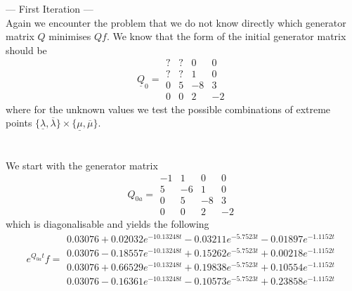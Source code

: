 \documentclass{article}
\begin{document}
--- First Iteration ---\\
Again we encounter the problem that we do not know directly which generator matrix $Q$ minimises $Qf$.
We know that the form of the initial generator matrix should be
\begin{equation*} 
 \underline{Q}_{0}= 
 \begin{array}{|rrrr|}
  ? & ? & 0 & 0 \\
  ? & ? & 1 & 0 \\
  0 & 5 & -8 & 3 \\
  0 & 0 & 2 & -2 
 \end{array}
 \end{equation*}
 where for the unknown values we test the possible combinations of extreme points $\{\underline{\lambda},\overline{\lambda}\}\times\{\underline{\mu},\overline{\mu}\}$.\\\\\\
We start with the generator matrix 
\begin{equation*} 
 Q_{0a}= 
 \begin{array}{|rrrr|}
  -1 & 1 & 0 & 0 \\
  5 & -6 & 1 & 0 \\
  0 & 5 & -8 & 3 \\
  0 & 0 & 2 & -2 
 \end{array}
 \end{equation*}
which is diagonalisable and yields the following
\begin{equation*} 
 e^{Q_{0a}t}f= 
 \begin{array}{|r|}
  0.03076+0.02032e^{-10.13248t}-0.03211e^{-5.7523t}-0.01897e^{-1.1152t}\\
  0.03076-0.18557e^{-10.13248t}+0.15262e^{-5.7523t}+ 0.00218e^{-1.1152t}  \\
  0.03076+0.66529e^{-10.13248t}+ 0.19838e^{-5.7523t}+ 0.10554e^{-1.1152t}  \\
  0.03076-0.16361e^{-10.13248t}- 0.10573e^{-5.7523t}+ 0.23858e^{-1.1152t}  
 \end{array}
 \end{equation*}
\end{document}
